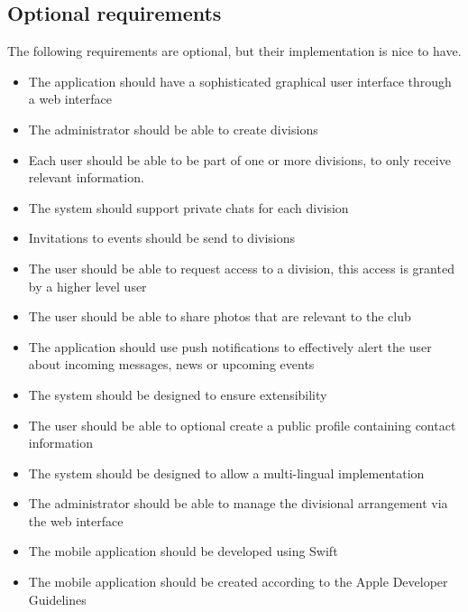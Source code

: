 \subsection{Optional requirements} %
The following requirements are optional, but their implementation is nice to have.
\begin{itemize}
\item The application should have a sophisticated graphical user interface through a web interface
\item The administrator should be able to create divisions
\item Each user should be able to be part of one or more divisions, to only receive relevant information.
\item The system should support private chats for each division
\item Invitations to events should be send to divisions
\item The user should be able to request access to a division, this access is granted by a higher level user
\item The user should be able to share photos that are relevant to the club
\item The application should use push notifications to effectively alert the user about incoming messages, news or upcoming events
\item The system should be designed to ensure extensibility
\item The user should be able to optional create a public profile containing contact information
\item The system should be designed to allow a multi-lingual implementation
\item The administrator should be able to manage the divisional arrangement via the web interface
\item The mobile application should be developed using Swift
\item The mobile application should be created according to the Apple Developer Guidelines
\end{itemize}

